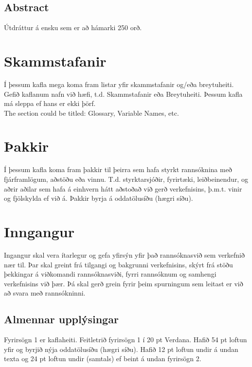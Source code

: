 \documentclass[a4paper, 12pt, twoside]{scrreprt}
\begin{document}
\section*{\huge Abstract}
Útdráttur á ensku sem er að hámarki 250 orð.
\vfill \vspace*{1cm}

\newpage

\tableofcontents
\listoffigures
\listoftables

\chapter*{Skammstafanir}
Í þessum kafla mega koma fram listar yfir skammstafanir og/eða breytuheiti. Gefið kaflanum nafn við hæfi, t.d. Skammstafanir eða Breytuheiti. Þessum kafla má sleppa ef hans er ekki þörf. \\

The section could be titled: Glossary, Variable Names, etc.

\chapter*{Þakkir}
Í þessum kafla koma fram þakkir til þeirra sem hafa styrkt rannsóknina með fjárframlögum, aðstöðu eða vinnu. T.d. styrktarsjóðir, fyrirtæki, leiðbeinendur, og aðrir aðilar sem hafa á einhvern hátt aðstoðað við gerð verkefnisins, þ.m.t. vinir og fjölskylda ef við á. Þakkir byrja á oddatölusíðu (hægri síðu).

\clearpage
\chapter{Inngangur}
\setcounter{page}{1}
Ingangur skal vera ítarlegur og gefa yfirsýn yfir það rannsóknasvið sem verkefnið nær til. Þar skal greint frá tilgangi og bakgrunni verkefnisins, skýrt frá stöðu þekkingar á viðkomandi rannsóknasviði, fyrri rannsóknum og samhengi verkefnisins við þær. Þá skal gerð grein fyrir þeim spurningum sem leitast er við að svara með rannsókninni.

\section{Almennar upplýsingar}
Fyrirsögn 1 er kaflaheiti. Feitletrið fyrirsögn 1 í 20 pt Verdana. Hafið 54 pt loftun yfir og byrjið nýja oddatölusíðu (hægri síðu). Hafið 12 pt loftun undir á undan texta og 24 pt loftun undir (samtals) ef beint á undan fyrirsögn 2.
\end{document}
